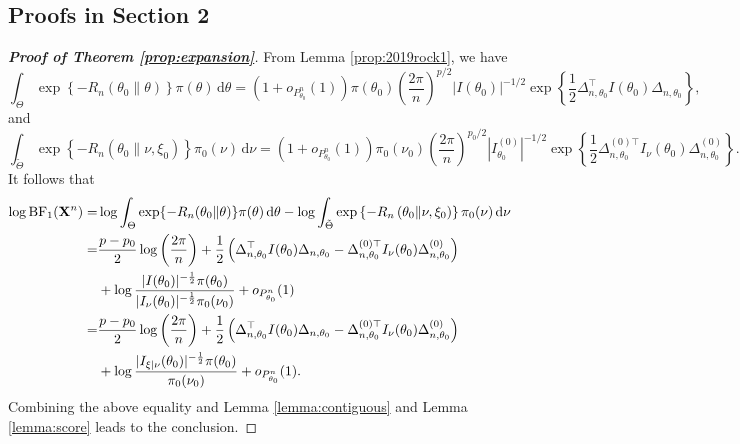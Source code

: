 \documentclass[11pt]{article}
\theoremstyle{plain}
\theoremstyle{definition}
\theoremstyle{remark}
\begin{document}
\begin{appendices}
\section{Proofs in Section 2}


    \begin{proof}[\textbf{Proof of Theorem \ref{prop:expansion}}]
From Lemma \ref{prop:2019rock1}, we have
$$
    \int_{\Theta}
    \exp\left\{-R_n(\theta_0\| \theta) \right\} \pi(\theta)
\, \mathrm d \theta
    =
    (1+o_{P^n_{\theta_0}}(1))
    \pi(\theta_0)
    \left(\frac{2\pi}{ n}\right)^{{p}/{2}}
    |I(\theta_0)|^{-{1}/{2}} 
    \exp
    \left\{ 
        \frac{1}{2}\Delta_{n,\theta_0}^\top  I({\theta_0})\Delta_{n,\theta_0}
\right\}
,
$$
and
\begin{equation*}
    \int_{\tilde \Theta}
    \exp\left\{- R_n\left(\theta_0\| \nu, \xi_0 \right)\right\} \pi_0(\nu)
\, \mathrm d \nu
    =
    (1+o_{P^n_{\theta_0}}(1))
    \pi_0(\nu_0)
    \left(\frac{2\pi}{ n}\right)^{{p_0}/{2}}
     |I_{\theta_0}^{(0)}|^{-{1}/{2}} 
     \exp\left\{ 
         \frac{1}{2}\Delta_{n,\theta_0}^{{(0)}\top} I_{\nu}(\theta_0)\Delta^{(0)}_{n,\theta_0}
     \right\}
     .
\end{equation*}
It follows that
\begin{align*}
    \log \text{BF}_1 (\mathbf{X}^{n})
    =&
    \log
    \int_{\Theta}
    \exp\{- R_n(\theta_0\| \theta)\} \pi(\theta)
\, \mathrm d \theta
-
    \log \int_{\tilde \Theta}
    \exp\left\{- R_n\left(\theta_0\| \nu, \xi_0 \right)\right\} \pi_0(\nu)
\, \mathrm d \nu
    \\
    =&
   {\frac{p-p_0}{2}} \log \left( \frac{2\pi}{n} \right)
+
        \frac 1 2 \left( 
            \Delta_{n,\theta_0}^\top  I(\theta_0)  \Delta_{n,\theta_0}
            -
            \Delta_{n,\theta_0}^{{(0)}\top} I_{\nu}(\theta_0)\Delta^{(0)}_{n,\theta_0}
        \right)
        \\
   &+
   \log
       \frac{
           |I(\theta_0)|^{-\frac 1 2}\pi(\theta_0) 
   }{
       |I_\nu(\theta_0)|^{-\frac 1 2}\pi_0(\nu_0)
}
    +o_{P^n_{\theta_0}}(1)
    \\
    =&
   {\frac{p-p_0}{2}} \log \left( \frac{2\pi}{n} \right)
+
        \frac 1 2 \left( 
            \Delta_{n,\theta_0}^\top  I(\theta_0)  \Delta_{n,\theta_0}
            -
            \Delta_{n,\theta_0}^{{(0)}\top} I_{\nu}(\theta_0)\Delta^{(0)}_{n,\theta_0}
        \right)
        \\
   &+
   \log
       \frac{
           |I_{\xi | \nu}(\theta_0)|^{-\frac 1 2}\pi(\theta_0) 
   }{
    \pi_0(\nu_0)
}
    +o_{P^n_{\theta_0}}(1)
    .
\end{align*}
Combining the above equality and Lemma \ref{lemma:contiguous} and Lemma \ref{lemma:score} leads to the conclusion.
    \end{proof}




\end{appendices}
\end{document}
